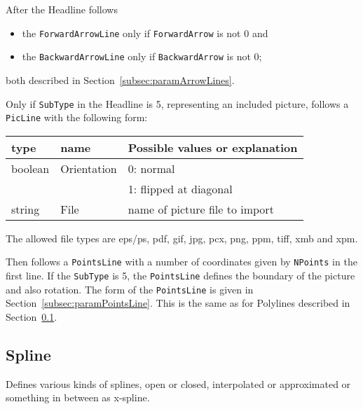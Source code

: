 \documentclass[10pt, a4paper]{article}%
\begin{document}
\noindent
After the Headline follows 
%
\begin{itemize}
\item
the \texttt{ForwardArrowLine}  only if \texttt{ForwardArrow}  is not 0 and 
\item
the \texttt{BackwardArrowLine} only if \texttt{BackwardArrow} is not 0; 
\end{itemize}
%
both described in Section~\ref{subsec:paramArrowLines}. 


Only if \texttt{SubType} in the Headline is 5, representing an included picture, 
follows a \texttt{PicLine} with the following form: \\
%
\begin{tabular}{lll}
\toprule
type    & name        & Possible values or explanation \\
\midrule
\midrule
boolean & Orientation & 0: normal \\
        &             & 1: flipped at diagonal \\
string  & File        & name of picture file to import \\
\bottomrule
\end{tabular}

The allowed file types are eps/ps, pdf, gif, jpg, pcx, png, ppm, tiff, xmb and xpm. 

Then follows a \texttt{PointsLine} with a number of coordinates 
given by \texttt{NPoints} in the first line. 
If the \texttt{SubType} is 5, the \texttt{PointsLine} 
defines the boundary of the picture and also rotation. 
The form of the \texttt{PointsLine} is given 
in Section~\ref{subsec:paramPointsLine}. 
This is the same as for Polylines described in Section~\ref{subsec:spline}. 



\subsection{Spline }\label{subsec:spline}

Defines various kinds of splines, 
open or closed, interpolated or approximated or 
something in between as x-spline. 
\end{document}
